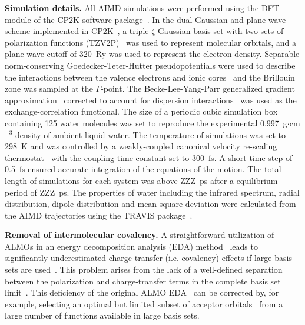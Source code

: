 \documentclass[aps,prl,reprint,amsmath,amssymb]{revtex4-1}
\begin{document}
\textbf{Simulation details.} All AIMD simulations were performed using the DFT module of the CP2K software package~\cite{www:cp2k}. 
In the dual Gaussian and plane-wave scheme implemented in CP2K~\cite{Hutter2014}, a triple-$\zeta$ Gaussian basis set with two sets of polarization functions (TZV2P)~\cite{vandevondele2007gaussian} was used to represent molecular orbitals, and a plane-wave cutoff of 320~Ry was used to represent the electron density. 
Separable norm-conserving Goedecker-Teter-Hutter pseudopotentials were used to describe the interactions between the valence electrons and ionic cores~\cite{goedecker1996separable,krack2005pseudopotentials} and the Brillouin zone was sampled at the $\Gamma$-point. 
The Becke-Lee-Yang-Parr generalized gradient approximation~\cite{becke1988density, lee1988development} corrected to account for dispersion interactions~\cite{grimme2010consistent} was used as the exchange-correlation functional. 
The size of a periodic cubic simulation box containing 125 water molecules was set to reproduce the experimental 0.997~g$\cdot$cm$^{-3}$ density of ambient liquid water. 
The temperature of simulations was set to 298~K and was controlled by a weakly-coupled canonical velocity re-scaling thermostat~\cite{bussi2007canonical} with the coupling time constant set to 300~fs. 
A short time step of 0.5~fs ensured accurate integration of the equations of the motion. 
The total length of simulations for each system was above ZZZ~ps after a equilibrium period of ZZZ~ps.
The properties of water including the infrared spectrum, radial distribution, dipole distribution and mean-square deviation were calculated from the AIMD trajectories using the TRAVIS package~\cite{brehm2012travis}.  

\textbf{Removal of intermolecular covalency.} A straightforward utilization of ALMOs in an energy decomposition analysis (EDA) method~\cite{khaliullin2007unravelling} leads to significantly underestimated charge-transfer (i.e. covalency) effects if large basis sets are used~\cite{horn2015polarization,herbert2016}. 
This problem arises from the lack of a well-defined separation between the polarization and charge-transfer terms in the complete basis set limit~\cite{misquitta2013saptdftct,horn2015polarization}. 
This deficiency of the original ALMO EDA~\cite{khaliullin2007unravelling} can be corrected by, for example, selecting an optimal but limited subset of acceptor orbitals~\cite{horn2015polarization} from a large number of functions available in large basis sets. 
\end{document}
